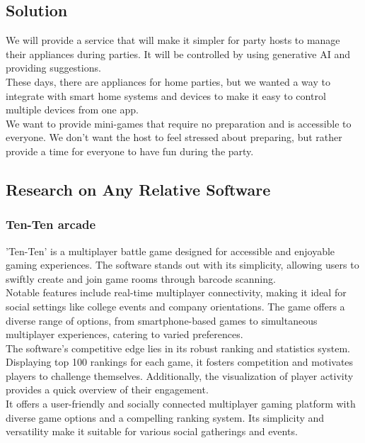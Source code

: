 \documentclass[conference]{IEEEtran}
\begin{document}
    \subsection{Solution}
        We will provide a service that will make it simpler for party hosts to manage their appliances during parties. It will be controlled by using generative AI and providing suggestions.\\
        These days, there are appliances for home parties, but we wanted a way to integrate with smart home systems and devices to make it easy to control multiple devices from one app.\\
        We want to provide  mini-games that require no preparation and is accessible to everyone. We don't want the host to feel stressed about preparing, but rather provide a time for everyone to have fun during the party.

    \subsection{Research on Any Relative Software}
        \subsubsection{Ten-Ten arcade}
            'Ten-Ten' is a multiplayer battle game designed for accessible and enjoyable gaming experiences. The software stands out with its simplicity, allowing users to swiftly create and join game rooms through barcode scanning.\\
            Notable features include real-time multiplayer connectivity, making it ideal for social settings like college events and company orientations. The game offers a diverse range of options, from smartphone-based games to simultaneous multiplayer experiences, catering to varied preferences.\\
            The software's competitive edge lies in its robust ranking and statistics system. Displaying top 100 rankings for each game, it fosters competition and motivates players to challenge themselves. Additionally, the visualization of player activity provides a quick overview of their engagement.\\
            It offers a user-friendly and socially connected multiplayer gaming platform with diverse game options and a compelling ranking system. Its simplicity and versatility make it suitable for various social gatherings and events.\\
\end{document}

